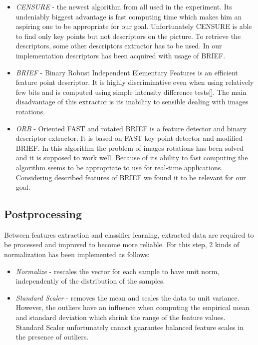\documentclass[11pt,a4paper]{article}
\begin{document}
\begin{itemize}
	\item \textit{CENSURE}\cite{CENSURE} - the newest algorithm from all used in the experiment. Its undeniably biggest advantage is fast computing time which makes him an aspiring one to be appropriate for our goal. Unfortunately CENSURE is able to find only key points but not descriptors on the picture. To retrieve the descriptors, some other descriptors extractor has to be used. In our implementation descriptors has been acquired with usage of BRIEF. 
	
	\item \textit{BRIEF}\cite{BRIEF} - Binary Robust Independent Elementary Features is an efficient feature point descriptor. It is highly discriminative even when using relatively few bits and is computed using simple intensity difference tests[]. The main disadvantage of this extractor is its inability to sensible dealing with images rotations.
	
	\item \textit{ORB}\cite{ORB} - Oriented FAST\cite{FAST} and rotated BRIEF is a feature detector and binary descriptor extractor. It is based on FAST key point detector and modified BRIEF. In this algorithm the problem of images rotations has been solved and it is supposed to work well. Because of its ability to fast computing the algorithm seems to be appropriate to use for real-time applications. Considering described features of BRIEF we found it to be relevant for our goal.
\end{itemize}

\subsection{Postprocessing}

Between features extraction and classifier learning, extracted data are required to be processed and improved to become more reliable. For this step, 2 kinds of normalization has been implemented as follows:

\begin{itemize}
	\item \textit{Normalize} \cite{PREPROCESSING}  - rescales the vector for each sample to have unit norm, independently of the distribution of the samples.
	
	\item \textit{Standard Scaler} \cite{PREPROCESSING}  - removes the mean and scales the data to unit variance. However, the outliers have an influence when computing the empirical mean and standard deviation which shrink the range of the feature values. Standard Scaler unfortunately cannot guarantee balanced feature scales in the presence of outliers.
\end{itemize}
\end{document}
